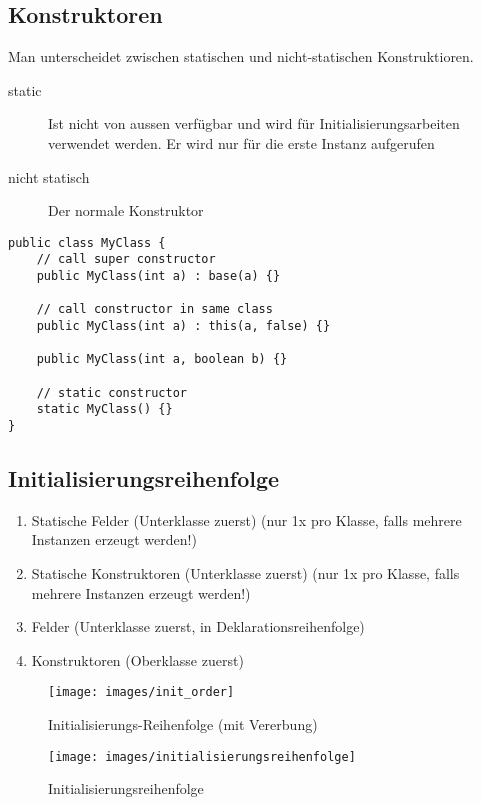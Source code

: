 \subsection{Konstruktoren}
Man unterscheidet zwischen statischen und nicht-statischen Konstruktioren.
\begin{description}
	\item[static] Ist nicht von aussen verfügbar und wird für Initialisierungsarbeiten verwendet werden. Er wird nur für die erste Instanz aufgerufen
	\item[nicht statisch] Der normale Konstruktor
\end{description}
\begin{lstlisting}
public class MyClass {
	// call super constructor
	public MyClass(int a) : base(a) {}

	// call constructor in same class
	public MyClass(int a) : this(a, false) {}
	
	public MyClass(int a, boolean b) {}
	
	// static constructor
	static MyClass() {}
}
\end{lstlisting}

\subsection{Initialisierungsreihenfolge}
\begin{enumerate}
	\item Statische Felder (Unterklasse zuerst) (nur 1x pro Klasse, falls mehrere Instanzen erzeugt werden!)
	\item Statische Konstruktoren (Unterklasse zuerst) (nur 1x pro Klasse, falls mehrere Instanzen erzeugt werden!)
	\item Felder (Unterklasse zuerst, in Deklarationsreihenfolge)
	\item Konstruktoren (Oberklasse zuerst)
\end{enumerate}

\begin{figure}[h]
\centering
\texttt{[image: images/init\_order]}
\caption{Initialisierungs-Reihenfolge (mit Vererbung)}
\label{fig:initorder}
\end{figure}

\begin{figure}[h]
\centering
\texttt{[image: images/initialisierungsreihenfolge]}
\caption{Initialisierungsreihenfolge}
\label{fig:initialisierungsreihenfolge}
\end{figure}

